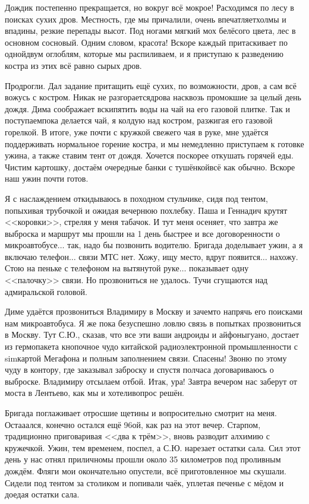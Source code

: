 Дождик постепенно прекращается, но вокруг всё мокрое! Расходимся по лесу в поисках сухих дров. Местность, где мы причалили, очень впечатляет\mdash холмы и впадины, резкие перепады высот. Под ногами мягкий мох белёсого цвета, лес в основном сосновый. Одним словом, красота! Вскоре каждый притаскивает по одной\sdash двум оглоблям, которые мы распиливаем, и я приступаю к разведению костра из этих всё равно сырых дров. 

Продрогли. Дал задание притащить ещё сухих, по возможности, дров, а сам всё вожусь с костром. Никак не разгорается\mdash дрова насквозь промокшие за целый день дождя. Дима соображает вскипятить воды на чай на его газовой плитке. Так и поступаем\mdash пока делается чай, я колдую над костром, разжигая его газовой горелкой. В итоге, уже почти с кружкой свежего чая в руке, мне удаётся поддерживать нормальное горение костра, и мы немедленно приступаем к готовке ужина, а также ставим тент от дождя. Хочется поскорее откушать горячей еды. Чистим картошку, достаём очередные банки с тушёнкой\mdash всё как обычно. Вскоре наш ужин почти готов. 

Я с наслаждением откидываюсь в походном стульчике, сидя под тентом, попыхивая трубочкой и ожидая вечернюю похлебку. Паша и Геннадич крутят <<коровки>>, стреляя у меня табачок. И тут меня осеняет, что завтра же выброска и маршрут мы прошли на 1 день быстрее и все договоренности о микроавтобусе$\ldots$ так, надо бы позвонить водителю. Бригада доделывает ужин, а я включаю телефон$\ldots$ связи МТС нет. Хожу, ищу место, вдруг появится$\ldots$ нахожу. Стою на пеньке с телефоном на вытянутой руке$\ldots$ показывает одну <<палочку>> связи. Но прозвониться не удалось. Тучи сгущаются над адмиральской головой. 

Диме удаётся прозвониться Владимиру в Москву и зачем\sdash то напрячь его поисками нам микроавтобуса. Я же пока безуспешно ловлю связь в попытках прозвониться в Москву. Тут С.Ю., сказав, что все эти ваши андроиды и айфоны\mdash гуано, достает из гермопакета кнопочное чудо китайской радиоэлектронной промышленности с sim\sdash картой Мегафона и полным заполнением связи. Спасены! Звоню по этому чуду в контору, где заказывал заброску и спустя полчаса договариваюсь о выброске. Владимиру отсылаем отбой. Итак, ура! Завтра вечером нас заберут от моста в Лентьево, как мы и хотели\mdash вопрос решён.

Бригада поглаживает отросшие щетины и вопросительно смотрит на меня. Оста\sdash а\sdash ался, конечно остался ещё 96\sdash ой, как раз на этот вечер. Старпом, традиционно приговаривая <<два к трём>>, вновь разводит алхимию с кружечкой. Ужин, тем временем, поспел, а С.Ю. нарезает остатки сала. Сил этот день у нас отнял прилично\mdash мы прошли около 35 километров под проливным дождём. Фляги мои окончательно опустели, всё приготовленное мы скушали. Сидели под тентом за столиком и попивали чаёк, уплетая печенье с мёдом и доедая остатки сала. 

